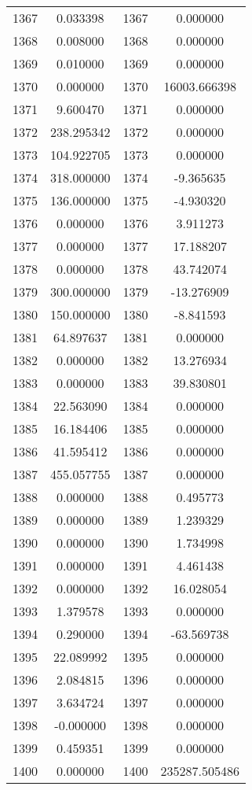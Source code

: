 \documentclass[12pt]{article}
\begin{document}
\begin{longtable}{@{}cccc@{}}
1367 & 0.033398 & 1367 & 0.000000 \\
1368 & 0.008000 & 1368 & 0.000000 \\
1369 & 0.010000 & 1369 & 0.000000 \\
1370 & 0.000000 & 1370 & 16003.666398 \\
1371 & 9.600470 & 1371 & 0.000000 \\
1372 & 238.295342 & 1372 & 0.000000 \\
1373 & 104.922705 & 1373 & 0.000000 \\
1374 & 318.000000 & 1374 & -9.365635 \\
1375 & 136.000000 & 1375 & -4.930320 \\
1376 & 0.000000 & 1376 & 3.911273 \\
1377 & 0.000000 & 1377 & 17.188207 \\
1378 & 0.000000 & 1378 & 43.742074 \\
1379 & 300.000000 & 1379 & -13.276909 \\
1380 & 150.000000 & 1380 & -8.841593 \\
1381 & 64.897637 & 1381 & 0.000000 \\
1382 & 0.000000 & 1382 & 13.276934 \\
1383 & 0.000000 & 1383 & 39.830801 \\
1384 & 22.563090 & 1384 & 0.000000 \\
1385 & 16.184406 & 1385 & 0.000000 \\
1386 & 41.595412 & 1386 & 0.000000 \\
1387 & 455.057755 & 1387 & 0.000000 \\
1388 & 0.000000 & 1388 & 0.495773 \\
1389 & 0.000000 & 1389 & 1.239329 \\
1390 & 0.000000 & 1390 & 1.734998 \\
1391 & 0.000000 & 1391 & 4.461438 \\
1392 & 0.000000 & 1392 & 16.028054 \\
1393 & 1.379578 & 1393 & 0.000000 \\
1394 & 0.290000 & 1394 & -63.569738 \\
1395 & 22.089992 & 1395 & 0.000000 \\
1396 & 2.084815 & 1396 & 0.000000 \\
1397 & 3.634724 & 1397 & 0.000000 \\
1398 & -0.000000 & 1398 & 0.000000 \\
1399 & 0.459351 & 1399 & 0.000000 \\
1400 & 0.000000 & 1400 & 235287.505486 \\

\end{longtable}
\end{document}
